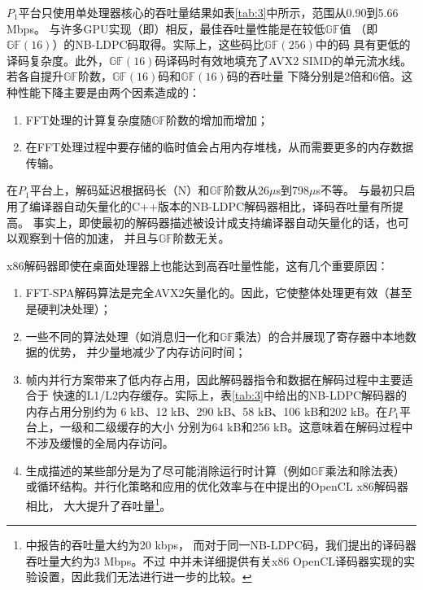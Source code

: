 \documentclass{cjc}
\begin{document}
  $P_1$平台只使用单处理器核心的吞吐量结果如表\ref{tab:3}中所示，范围从0.90到5.66 Mbps。
  与许多GPU实现（即\cite{noauthor_andrade_nodate}）相反，最佳吞吐量性能是在较低$\mathbb{GF}$值
  （即$\mathbb{GF}(16)$）的NB-LDPC码取得。实际上，这些码比$\mathbb{GF}(256)$中的码
  具有更低的译码复杂度。此外，$\mathbb{GF}(16)$码译码时有效地填充了AVX2 SIMD的单元流水线。
  若各自提升$\mathbb{GF}$阶数，$\mathbb{GF}(16)$码和$\mathbb{GF}(16)$码的吞吐量
  下降分别是2倍和6倍。这种性能下降主要是由两个因素造成的：
\begin{enumerate}
  \item FFT处理的计算复杂度随$\mathbb{GF}$阶数的增加而增加；
  \item 在FFT处理过程中要存储的临时值会占用内存堆栈，从而需要更多的内存数据传输。
\end{enumerate}

  在$P_1$平台上，解码延迟根据码长（N）和$\mathbb{GF}$阶数从26$\mu$s到798$\mu$s不等。
  与最初只启用了编译器自动矢量化的C++版本的NB-LDPC解码器相比，译码吞吐量有所提高。
  事实上，即使最初的解码器描述被设计成支持编译器自动矢量化的话，也可以观察到十倍的加速，
  并且与$\mathbb{GF}$阶数无关。
  
  x86解码器即使在桌面处理器上也能达到高吞吐量性能，这有几个重要原因：
  \begin{enumerate}
    \item FFT-SPA解码算法是完全AVX2矢量化的。因此，它使整体处理更有效（甚至是硬判决处理）；
    \item 一些不同的算法处理（如消息归一化和$\mathbb{GF}$乘法）的合并展现了寄存器中本地数据的优势，
    并少量地减少了内存访问时间；
    \item 帧内并行方案带来了低内存占用，因此解码器指令和数据在解码过程中主要适合于
    快速的L1/L2内存缓存。实际上，表\ref{tab:3}中给出的NB-LDPC解码器的内存占用分别约为
    6 kB、12 kB、290 kB、58 kB、106 kB和202 kB。在$P_1$平台上，一级和二级缓存的大小
    分别为64 kB和256 kB。这意味着在解码过程中不涉及缓慢的全局内存访问。
    \item 生成描述的某些部分是为了尽可能消除运行时计算（例如$\mathbb{GF}$乘法和除法表）
    或循环结构。并行化策略和应用的优化效率与在\cite{noauthor_wang_nodate}中提出的OpenCL x86解码器相比，
    大大提升了吞吐量\footnote{\cite{noauthor_wang_nodate}中报告的吞吐量大约为20 kbps，
    而对于同一NB-LDPC码，我们提出的译码器吞吐量大约为3 Mbps。不过\cite{noauthor_wang_nodate}
    中并未详细提供有关x86 OpenCL译码器实现的实验设置，因此我们无法进行进一步的比较。}。
  \end{enumerate}
\end{document}

